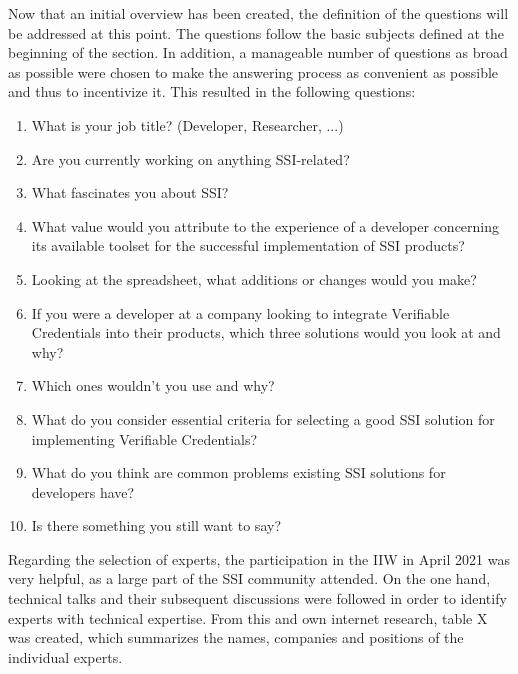     Now that an initial overview has been created, the definition of the questions will be addressed at this point. The questions follow the basic subjects defined at the beginning of the section. In addition, a manageable number of questions as broad as possible were chosen to make the answering process as convenient as possible and thus to incentivize it. This resulted in the following questions:
    
    \begin{enumerate}
        \item What is your job title? (Developer, Researcher, ...)		
        \item Are you currently working on  anything SSI-related?		
        \item What fascinates you about SSI?		
        \item What value would you attribute to the experience of a developer concerning its available toolset for the successful implementation of SSI products?		
        \item Looking at the spreadsheet, what additions or changes would you make?		
        \item If you were a developer at a company looking to integrate Verifiable Credentials into their products, which three solutions would you look at and why?		
        \item Which ones wouldn't you use and why?		
        \item What do you consider essential criteria for selecting a good SSI solution for implementing Verifiable Credentials?		
        \item What do you think are common problems existing SSI solutions for developers have? 
        \item Is there something you still want to say?
    \end{enumerate}
    
    Regarding the selection of experts, the participation in the \ac{IIW} in April 2021 was very helpful, as a large part of the SSI community attended. On the one hand, technical talks and their subsequent discussions were followed in order to identify experts with technical expertise. From this and own internet research, table X was created, which summarizes the names, companies and positions of the individual experts.

